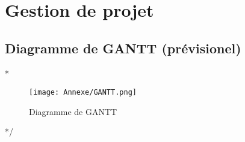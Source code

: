 \section{Gestion de projet}
\subsection{Diagramme de GANTT (prévisionel)}
\/*
\begin{figure}
	\texttt{[image: Annexe/GANTT.png]}
	\caption{Diagramme de GANTT}
	\label{fig:GANTT}
\end{figure}
*/

